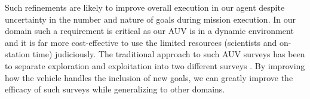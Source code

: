 
Such refinements are likely to improve overall execution in our agent
despite uncertainty in the number and nature of goals during mission
execution. 
In our domain such a requirement is critical as our AUV is in a
dynamic environment and it is far more cost-effective to use the
limited resources (scientists and on-station time) judiciously.  The
traditional approach to such AUV surveys has been to separate
exploration and exploitation into two different surveys
\cite{Yoerger01012007}.  By improving how the vehicle handles the
inclusion of new goals, we can greatly improve the efficacy of such
surveys while generalizing to other domains.







